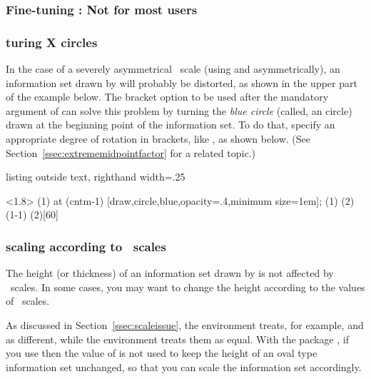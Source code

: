 \subsubsection{Fine-tuning \protect\cmd{\cntmAInfosetO}: Not for most users}
\label{ssec:turnxangles}

\subsubsection*{turing X circles}

In the case of a severely asymmetrical \TikZ\ scale (using  and  asymmetrically), an information set drawn by \cmd{\cntmAInfosetO} will probably be distorted, as shown in the upper part of the example below.
The bracket option to be used after the mandatory argument of \cmd{\cntmAInfosetO} can solve this problem by turning the \emph{blue circle} (called, an  circle) drawn at the beginning point of the information set.
To do that, specify an appropriate degree of rotation in brackets, like , as shown below.
(See Section~\ref{ssec:extrememidpointfactor} for a related topic.)

\begin{tcblisting}{listing outside text, righthand width=.25\linewidth}
\begin{istgame}[xscale=4]
\cntmdistance*{15mm}{10mm}
\cntmApreset<1.8>
\istrootcntmA(1)       \istbA  \endist
\node at (cntm-1)
      [draw,circle,blue,opacity=.4,minimum size=1em]{};
\cntmAInfosetO(1)
\istrootcntmA(2)(1-1)  \istbA  \endist
\cntmAInfosetO(2)[60]
\end{istgame}
\end{tcblisting}


\subsubsection*{scaling \cmd{\cntmAInfosetO} according to \TikZ\ scales}
\label{page:scaleissue-cntm}

The height (or thickness) of an information set drawn by \cmd{\cntmAInfosetO} is not affected by \TikZ\ scales.
In some cases, you may want to change the height according to the values of \TikZ\ scales.

As discussed in Section~\ref{ssec:scaleissue}, the  environment treats, for example, \xw{[scale=.7]} and \xw{[scale=.7,xscale=1]} as different, while the  environment treats them as equal.
With the package , if you use \xw{[scale=.7,xscale=1]} then the value of  is not used to keep the height of an oval type information set unchanged, so that you can scale the information set accordingly.

